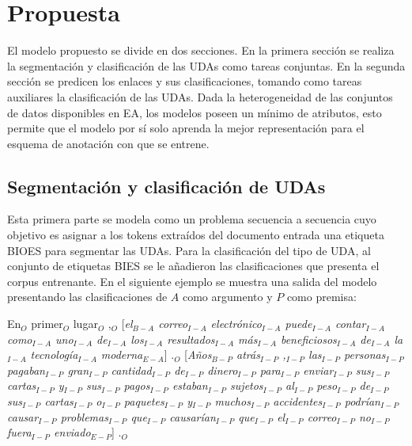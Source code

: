 \chapter{Propuesta}\label{chapter:proposal}

El modelo propuesto se divide en dos secciones. En la primera sección se realiza la segmentación y clasificación de 
las UDAs como tareas conjuntas. En la segunda sección se predicen los enlaces y sus clasificaciones, tomando
como tareas auxiliares la clasificación de las UDAs. Dada la heterogeneidad de las conjuntos de datos disponibles 
en EA, los modelos poseen un mínimo de atributos, esto permite que el modelo por sí solo aprenda 
la mejor representación para el esquema de anotación con que se entrene.

\section{Segmentación y clasificación de UDAs}

Esta primera parte se modela como un problema secuencia a secuencia cuyo objetivo es asignar a los tokens 
extraídos del documento entrada una etiqueta BIOES para segmentar las UDAs. Para la clasificación del tipo 
de UDA, al conjunto de etiquetas BIES se le añadieron las clasificaciones que presenta el corpus entrenante.
En el siguiente ejemplo se muestra una salida del modelo presentando las clasificaciones de
$A$ como argumento y $P$ como premisa:

\begin{adjustwidth}{25pt}{25pt}
    En$_O$ primer$_O$ lugar$_O$ ,$_O$ [\emph{el$_{B-A}$ correo$_{I-A}$ electrónico$_{I-A}$ puede$_{I-A}$ 
    contar$_{I-A}$ como$_{I-A}$ uno$_{I-A}$ de$_{I-A}$ los$_{I-A}$ resultados$_{I-A}$
    más$_{I-A}$ beneficiosos$_{I-A}$ de$_{I-A}$ la$_{I-A}$ tecnología$_{I-A}$ moderna$_{E-A}$}] .$_{O}$ 
    [\emph{Años$_{B-P}$ atrás$_{I-P}$ ,$_{I-P}$ las$_{I-P}$ personas$_{I-P}$ pagaban$_{I-P}$ gran$_{I-P}$ cantidad$_{I-P}$ 
    de$_{I-P}$ dinero$_{I-P}$ para$_{I-P}$ enviar$_{I-P}$ sus$_{I-P}$ cartas$_{I-P}$ y$_{I-P}$ sus$_{I-P}$ 
    pagos$_{I-P}$ estaban$_{I-P}$ sujetos$_{I-P}$ al$_{I-P}$ peso$_{I-P}$ de$_{I-P}$ sus$_{I-P}$ 
    cartas$_{I-P}$ o$_{I-P}$ paquetes$_{I-P}$ y$_{I-P}$ muchos$_{I-P}$ accidentes$_{I-P}$ podrían$_{I-P}$
    causar$_{I-P}$ problemas$_{I-P}$ que$_{I-P}$ causarían$_{I-P}$ que$_{I-P}$ el$_{I-P}$ correo$_{I-P}$ 
    no$_{I-P}$ fuera$_{I-P}$ enviado$_{E-P}$}] .$_{O}$
\end{adjustwidth}

